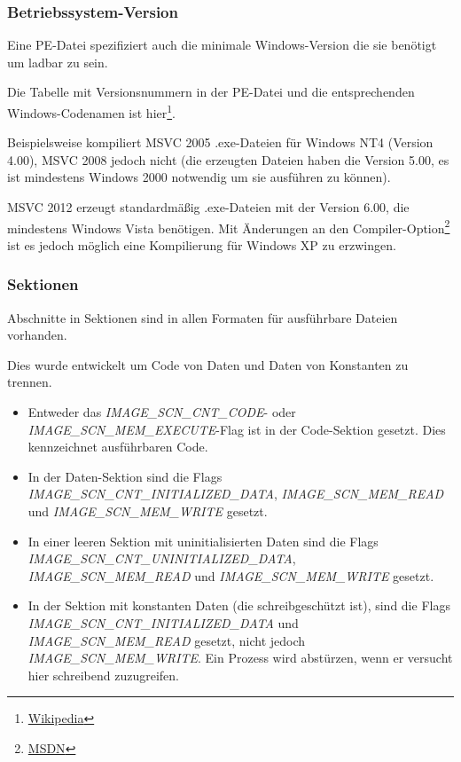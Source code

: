 \subsubsection{Betriebssystem-Version}

Eine PE-Datei spezifiziert auch die minimale Windows-Version die sie benötigt um
ladbar zu sein.

Die Tabelle mit Versionsnummern in der PE-Datei und die entsprechenden Windows-Codenamen
ist hier\footnote{\href{http://go.yurichev.com/17044}{Wikipedia}}.

Beispielsweise kompiliert \ac{MSVC} 2005 .exe-Dateien für Windows NT4 (Version 4.00),
\ac{MSVC} 2008 jedoch nicht (die erzeugten Dateien haben die Version 5.00, es ist
mindestens Windows 2000 notwendig um sie ausführen zu können).


\ac{MSVC} 2012 erzeugt standardmäßig .exe-Dateien mit der Version 6.00, die mindestens
Windows Vista benötigen.
Mit Änderungen an den Compiler-Option\footnote{\href{http://go.yurichev.com/17045}{MSDN}}
ist es jedoch möglich eine Kompilierung für Windows XP zu erzwingen.

\subsubsection{Sektionen}

Abschnitte in Sektionen sind in allen Formaten für ausführbare Dateien vorhanden.

Dies wurde entwickelt um Code von Daten und Daten von Konstanten zu trennen.

\begin{itemize}
\item Entweder das \emph{IMAGE\_SCN\_CNT\_CODE}- oder \emph{IMAGE\_SCN\_MEM\_EXECUTE}-Flag
ist in der Code-Sektion gesetzt. Dies kennzeichnet ausführbaren Code.

\item In der Daten-Sektion sind die Flags \emph{IMAGE\_SCN\_CNT\_INITIALIZED\_DATA},
\emph{IMAGE\_SCN\_MEM\_READ} und \emph{IMAGE\_SCN\_MEM\_WRITE} gesetzt.

\item In einer leeren Sektion mit uninitialisierten Daten sind die Flags
\emph{IMAGE\_SCN\_CNT\_UNINITIALIZED\_DATA}, \emph{IMAGE\_SCN\_MEM\_READ} und
\emph{IMAGE\_SCN\_MEM\_WRITE} gesetzt.

\item In der Sektion mit konstanten Daten (die schreibgeschützt ist), sind die
Flags \emph{IMAGE\_SCN\_CNT\_INITIALIZED\_DATA} und \emph{IMAGE\_SCN\_MEM\_READ}
gesetzt, nicht jedoch \emph{IMAGE\_SCN\_MEM\_WRITE}.
Ein Prozess wird abstürzen, wenn er versucht hier schreibend zuzugreifen.

\end{itemize}

